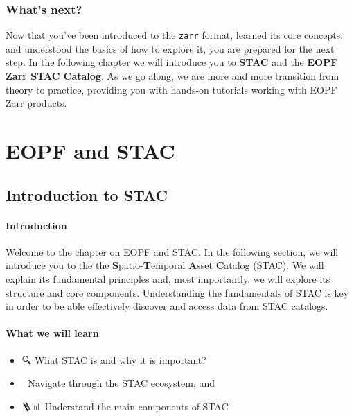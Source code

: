 \documentclass[
  letterpaper,
  DIV=11,
  numbers=noendperiod]{scrreprt}
\providecommand{\tightlist}{%
  \setlength{\itemsep}{0pt}\setlength{\parskip}{0pt}}
\begin{document}
\section{What's next?}\label{whats-next-4}

Now that you've been introduced to the \texttt{zarr} format, learned its
core concepts, and understood the basics of how to explore it, you are
prepared for the next step. In the following
\href{./31_stac_intro.qmd}{chapter} we will introduce you to
\textbf{STAC} and the \textbf{EOPF Zarr STAC Catalog}. As we go along,
we are more and more transition from theory to practice, providing you
with hands-on tutorials working with EOPF Zarr products.

\part{\textbf{EOPF and STAC}}

\chapter{Introduction to STAC}\label{introduction-to-stac}

\subsection{Introduction}\label{introduction-5}

Welcome to the chapter on EOPF and STAC. In the following section, we
will introduce you to the the \textbf{S}patio-\textbf{T}emporal
\textbf{A}sset \textbf{C}atalog (STAC). We will explain its fundamental
principles and, most importantly, we will explore its structure and core
components. Understanding the fundamentals of STAC is key in order to be
able effectively discover and access data from STAC catalogs.

\subsection{What we will learn}\label{what-we-will-learn-4}

\begin{itemize}
\tightlist
\item
  🔍 What STAC is and why it is important?
\item
  🌳 Navigate through the STAC ecosystem, and
\item
  🪜📊 Understand the main components of STAC
\end{itemize}
\end{document}

